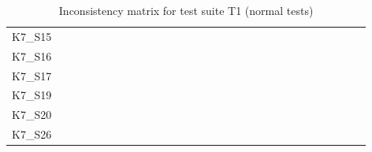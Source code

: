 \begin{table}
\begin{tabular}{l|rrrrrrrrrrrrrrrrrrrrrrrrrrrr}
        K7\_S15 & \y & \y & \y & \y & \y & \y & \y & \y & \y & \y & \y & \y & \y & \y & \y & \y & \y & \y & \y & \y & \y & \y & \y & \y & \y & \y & \y & \y \\
        K7\_S16 & \y & \y & \y & \x & \y & \y & \y & \y & \y & \y & \y & \y & \y & \y & \y & \y & \y & \y & \y & \y & \y & \y & \y & \y & \y & \y & \y & \y \\
        K7\_S17 & \y & \y & \y & \y & \y & \y & \y & \y & \y & \y & \y & \y & \y & \y & \y & \y & \y & \y & \x & \y & \x & \y & \x & \x & \y & \y & \y & \y \\
        K7\_S19 & \y & \y & \y & \y & \y & \y & \y & \y & \y & \y & \y & \y & \y & \y & \y & \y & \y & \y & \y & \y & \y & \y & \y & \y & \y & \y & \y & \y \\
        K7\_S20 & \y & \y & \y & \y & \y & \y & \y & \y & \y & \y & \y & \y & \y & \y & \y & \y & \y & \y & \y & \y & \y & \y & \y & \y & \y & \y & \y & \y \\
        K7\_S26 & \y & \y & \y & \y & \y & \y & \y & \y & \y & \y & \y & \y & \y & \y & \y & \y & \y & \y & \y & \y & \y & \y & \y & \y & \y & \y & \y & \y \\
        \bottomrule
    \end{tabular}
    \caption{Inconsistency matrix for test suite T1 (normal tests)}
    \label{tab:inconsistencies_matrix_normal}
    \setlength{\tabcolsep}{\defaulttabcolsep}
\end{table}

